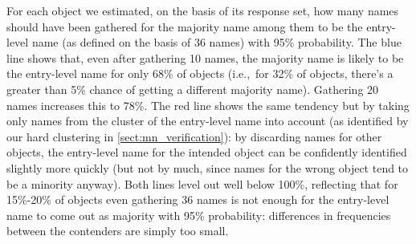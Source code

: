 For each object we estimated, on the basis of its \mn response set, how many names should have been gathered for the majority name among them to be the entry-level name (as defined on the basis of 36 names) with 95\% probability. %
The blue line shows that, even after gathering 10 names, the majority name is  likely to be the entry-level name for only 68\% of objects (i.e.,~for 32\% of objects, there's a greater than 5\% chance of getting a different majority name).
Gathering 20 names increases this to 78\%.
The red line shows the same tendency but by taking only names from the cluster of the entry-level name into account (as identified by our hard clustering in \ref{sect:mn_verification}): 
by discarding names for other objects, the entry-level name for the intended object can be confidently identified slightly more quickly (but not by much, since names for the wrong object tend to be a minority anyway).
Both lines level out well below 100\%, reflecting that for 15\%-20\%  of objects even gathering 36 names is not enough for the entry-level name to come out as majority with 95\% probability: differences in frequencies between the contenders are simply too small.

